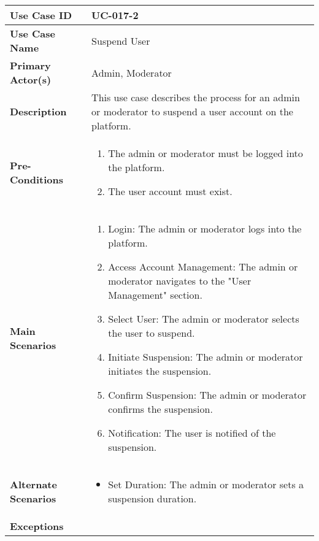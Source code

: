 \begin{table}[!ht]
    \centering
    \renewcommand{\arraystretch}{1.3} %
    \begin{tabularx}{\textwidth}{|l|X|}
        \hline
        \textbf{Use Case ID} & UC-017-2 \\
        \hline
        \textbf{Use Case Name} & Suspend User \\
        \hline
        \textbf{Primary Actor(s)} & Admin, Moderator \\
        \hline
        \textbf{Description} & This use case describes the process for an admin or moderator to suspend a user account on the platform. \\
        \hline
        \textbf{Pre-Conditions} & 
        \begin{enumerate}[label=\arabic*.,itemsep=0pt]
            \item The admin or moderator must be logged into the platform.
            \item The user account must exist.
        \end{enumerate} \\
        \hline
        \textbf{Main Scenarios} & 
        \begin{enumerate}[label=\arabic*.,itemsep=0pt]
            \item Login: The admin or moderator logs into the platform.
            \item Access Account Management: The admin or moderator navigates to the "User Management" section.
            \item Select User: The admin or moderator selects the user to suspend.
            \item Initiate Suspension: The admin or moderator initiates the suspension.
            \item Confirm Suspension: The admin or moderator confirms the suspension.
            \item Notification: The user is notified of the suspension.
        \end{enumerate} \\
        \hline
        \textbf{Alternate Scenarios} & 
        \begin{itemize}[label=--,itemsep=0pt]
            \item Set Duration: The admin or moderator sets a suspension duration.
        \end{itemize} \\
        \hline
        \textbf{Exceptions} & 

\end{tabularx}
\end{table}
